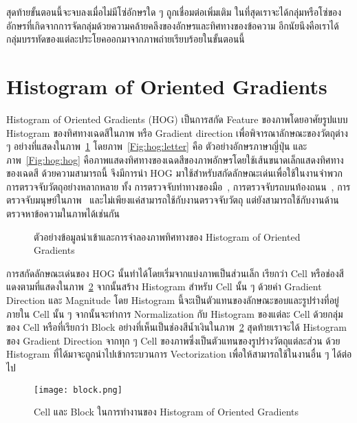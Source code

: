 สุดท้ายขั้นตอนนี้จะจบลงเมื่อไม่มีโซ่อักษรใด ๆ ถูกเชื่อมต่อเพิ่มเติม ในที่สุดเราจะได้กลุ่มหรือโซ่ของอักษรที่เกิดจากการจัดกลุ่มด้วยความคล้ายคลึงของอักษรและทิศทางของข้อความ อีกนัยนึงคือเราได้กลุ่มบรรทัดของแต่ละประโยคออกมาจากภาพถ่ายเรียบร้อยในขั้นตอนนี้

\section{Histogram of Oriented Gradients}

Histogram of Oriented Gradients (HOG) เป็นการสกัด Feature ของภาพโดยอาศัยรูปแบบ Histogram ของทิศทางเฉดสีในภาพ หรือ Gradient direction เพื่อพิจารณาลักษณะของวัตถุต่าง ๆ อย่างที่แสดงในภาพ~\ref{Fig:hog} โดยภาพ~\ref{Fig:hog:letter} คือ ตัวอย่างอักษรภาษาญี่ปุ่น และภาพ~\ref{Fig:hog:hog} คือภาพแสดงทิศทางของเฉดสีของภาพอักษรโดยใช้เส้นขนาดเล็กแสดงทิศทางของเฉดสี ด้วยความสามารถนี้ จึงมีการนำ HOG มาใช้สำหรับสกัดลักษณะเด่นเพื่อใช้ในงานจำพวกการตรวจจับวัตถุอย่างหลากหลาย ทั้ง การตรวจจับท่าทางของมือ~\cite{Freeman}, การตรวจจับรถบนท้องถนน~\cite{8314922}, การตรวจจับมนุษย์ในภาพ~\cite{1467360} และไม่เพียงแค่สามารถใช้กับงานตรวจจับวัตถุ แต่ยังสามารถใช้กับงานด้านตรวจหาข้อความในภาพได้เช่นกัน~\cite{DBLP:journals/corr/WangWZLZ15, 6628751, 8280697}

\begin{figure}[!h]
    \centering
    \caption{ตัวอย่างข้อมูลนำเข้าและการจำลองภาพทิศทางของ Histogram of Oriented Gradients}
    \label{Fig:hog}
\end{figure}

การสกัดลักษณะเด่นของ HOG นั้นทำได้โดยเริ่มจากแบ่งภาพเป็นส่วนเล็ก เรียกว่า Cell หรือช่องสีแดงตามที่แสดงในภาพ~\ref{Fig:cell-and-block} จากนั้นสร้าง Histogram สำหรับ Cell นั้น ๆ ด้วยค่า Gradient Direction และ Magnitude โดย Histogram นี้จะเป็นตัวแทนของลักษณะขอบและรูปร่างที่อยู่ภายใน Cell นั้น ๆ จากนั้นจะทำการ Normalization กับ Histogram ของแต่ละ Cell ด้วยกลุ่มของ Cell หรือที่เรียกว่า Block อย่างที่เห็นเป็นช่องสีน้ำเงินในภาพ~\ref{Fig:cell-and-block} สุดท้ายเราจะได้ Histogram ของ Gradient Direction จากทุก ๆ Cell ของภาพซึ่งเป็นตัวแทนของรูปร่างวัตถุแต่ละส่วน ด้วย Histogram ที่ได้มาจะถูกนำไปเข้ากระบวนการ Vectorization เพื่อให้สามารถใช้ในงานอื่น ๆ ได้ต่อไป

\begin{figure}[!h]
    \centering
    \texttt{[image: block.png]}  
    \caption{Cell และ Block ในการทำงานของ Histogram of Oriented Gradients}
    \label{Fig:cell-and-block}
\end{figure}

